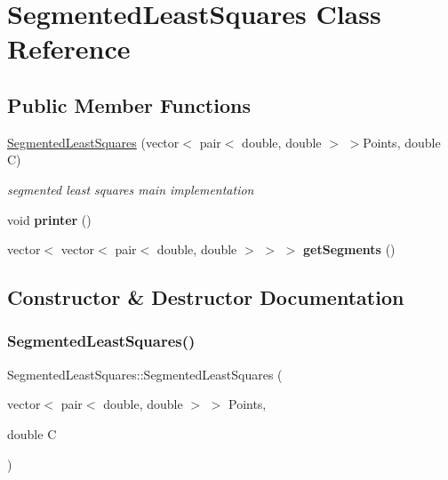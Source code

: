 \hypertarget{class_segmented_least_squares}{}\section{Segmented\+Least\+Squares Class Reference}
\label{class_segmented_least_squares}
\subsection*{Public Member Functions}
\begin{DoxyCompactItemize}
\item 
\hyperlink{class_segmented_least_squares_afede76727bbfda628b0fb8ec92d9bbd7}{Segmented\+Least\+Squares} (vector$<$ pair$<$ double, double $>$ $>$Points, double C)
\begin{DoxyCompactList}\small\item\em segmented least squares main implementation \end{DoxyCompactList}\item 
\mbox{\label{class_segmented_least_squares_a1417cb33f64b93e740e4d330cb3e4e04}} 
void {\bfseries printer} ()
\item 
\mbox{\label{class_segmented_least_squares_aee7d5bb1655019c7298a263347387d75}} 
vector$<$ vector$<$ pair$<$ double, double $>$ $>$ $>$ {\bfseries get\+Segments} ()
\end{DoxyCompactItemize}


\subsection{Constructor \& Destructor Documentation}
\mbox{\label{class_segmented_least_squares_afede76727bbfda628b0fb8ec92d9bbd7}} 
\subsubsection{\texorpdfstring{Segmented\+Least\+Squares()}{SegmentedLeastSquares()}}
{\footnotesize\ttfamily Segmented\+Least\+Squares\+::\+Segmented\+Least\+Squares (\begin{DoxyParamCaption}\item[{vector$<$ pair$<$ double, double $>$ $>$}]{Points,  }\item[{double}]{C }\end{DoxyParamCaption})\hspace{0.3cm}{\ttfamily [inline]}}



